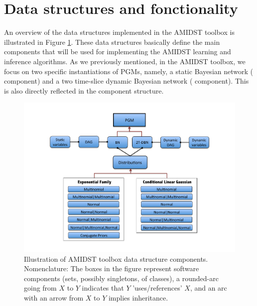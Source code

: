 \section{Data structures and fonctionality} \label{sec:DataStructures}

An overview of the data structures implemented in the AMIDST toolbox is illustrated in Figure \ref{Figure:ToolboxDataStructures}. These data structures basically define the main components that will be used for implementing the AMIDST learning and inference algorithms. As we previously mentioned, in the AMIDST toolbox, we focus on two specific instantiations of PGMs, namely, a static Bayesian network ( component) and a two time-slice dynamic Bayesian network ( component). This is also directly reflected in the component structure.

\vspace{-0.1in}

\begin{figure}[ht!]
\begin{center}
\includegraphics[width=\linewidth]{./figures/DataStructure}
\vspace{-0.5in}
\caption{\label{Figure:ToolboxDataStructures} Illustration of AMIDST toolbox data structure components. Nomenclature: The boxes in the
      figure represent software components (sets, possibly singletons, of classes), a rounded-arc going from $X$ to $Y$ indicates that $Y$ 'uses/references' $X$, and an arc with an arrow from $X$ to $Y$ implies inheritance.}
\end{center}
\end{figure}

